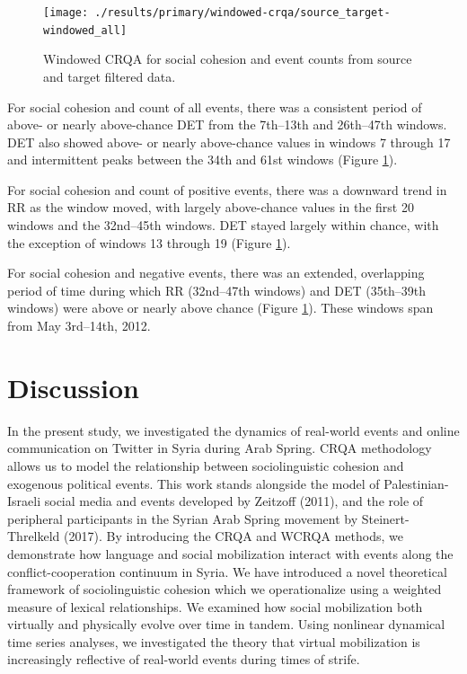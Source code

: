 \documentclass[english,man]{apa6}
\begin{document}
\begin{figure}
\texttt{[image: ./results/primary/windowed-crqa/source\_target-windowed\_all]} \caption{Windowed CRQA for social cohesion and event counts from source and target filtered data.}\label{fig:plot-wcrqa-source-targ-all}
\end{figure}

For social cohesion and count of all events, there was a consistent period of
above- or nearly above-chance DET from the 7th--13th and 26th--47th windows. DET
also showed above- or nearly above-chance values in windows 7 through 17 and
intermittent peaks between the 34th and 61st windows (Figure
\ref{fig:plot-wcrqa-source-targ-all}).

For social cohesion and count of positive events, there was a downward trend in
RR as the window moved, with largely above-chance values in the first 20 windows
and the 32nd--45th windows. DET stayed largely within chance, with the exception
of windows 13 through 19 (Figure \ref{fig:plot-wcrqa-source-targ-all}).

For social cohesion and negative events, there was an extended, overlapping
period of time during which RR (32nd--47th windows) and DET (35th--39th windows)
were above or nearly above chance (Figure
\ref{fig:plot-wcrqa-source-targ-all}). These windows span from May 3rd--14th,
2012.

\hypertarget{discussion}{%
\section{Discussion}\label{discussion}}

In the present study, we investigated the dynamics of real-world events and
online communication on Twitter in Syria during Arab Spring. CRQA methodology
allows us to model the relationship between sociolinguistic cohesion and
exogenous political events. This work stands alongside the model of
Palestinian-Israeli social media and events developed by Zeitzoff (2011), and
the role of peripheral participants in the Syrian Arab Spring movement by
Steinert-Threlkeld (2017). By introducing the CRQA and WCRQA methods, we
demonstrate how language and social mobilization interact with events along the
conflict-cooperation continuum in Syria. We have introduced a novel theoretical
framework of sociolinguistic cohesion which we operationalize using a weighted
measure of lexical relationships. We examined how social mobilization both
virtually and physically evolve over time in tandem. Using nonlinear dynamical
time series analyses, we investigated the theory that virtual mobilization is
increasingly reflective of real-world events during times of strife.
\end{document}
